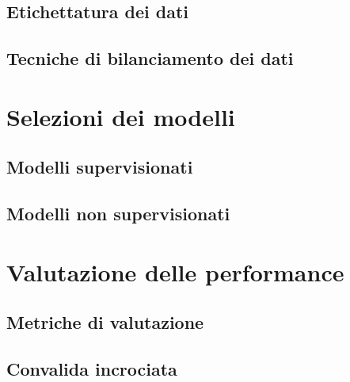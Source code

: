 







%

\subsection{Etichettatura dei dati} %


\subsection{Tecniche di bilanciamento dei dati} %





\section{Selezioni dei modelli}
\subsection{Modelli supervisionati}
\subsection{Modelli non supervisionati}
\section{Valutazione delle performance}
\subsection{Metriche di valutazione}
\subsection{Convalida incrociata}

